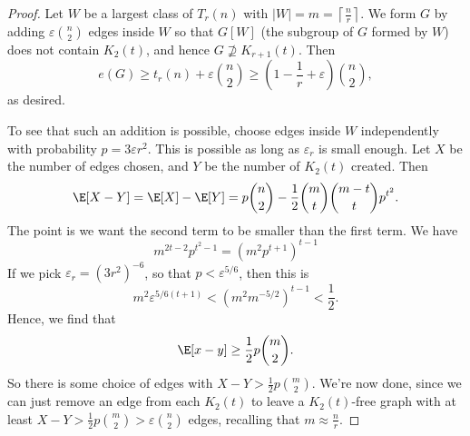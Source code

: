 \documentclass[a4paper]{article}
\begin{document}
\begin{proof}
  Let $W$ be a largest class of $T_r(n)$ with $|W| = m = \left\lceil \frac{n}{r}\right\rceil$. We form $G$ by adding $\varepsilon \binom{n}{2}$ edges inside $W$ so that $G[W]$ (the subgroup of $G$ formed by $W$) does not contain $K_2(t)$, and hence $G \not\supseteq K_{r + 1}(t)$. Then
  \[
    e(G) \geq t_r(n) + \varepsilon \binom{n}{2} \geq \left(1 - \frac{1}{r} +\varepsilon \right) \binom{n}{2},
  \]
  as desired.

  To see that such an addition is possible, choose edges inside $W$ independently with probability $p = 3 \varepsilon r^2$. This is possible as long as $\varepsilon_r$ is small enough. Let $X$ be the number of edges chosen, and $Y$ be the number of $K_2(t)$ created. Then
  \[
    \E[X - Y] = \E[X] - \E[Y] = p\binom{n}{2} - \frac{1}{2}\binom{m}{t} \binom{m - t}{t} p^{t^2}.
  \]
  The point is we want the second term to be smaller than the first term. We have
  \[
    m^{2t - 2}p^{t^2 - 1} = (m^2 p^{t + 1})^{t - 1}
  \]
  If we pick $\varepsilon_r = (3r^2)^{-6}$, so that $p < \varepsilon^{5/6}$, then this is
  \[
    m^2 \varepsilon^{5/6 (t + 1)} < (m^2 m^{-5/2})^{t - 1} < \frac{1}{2}.
  \]
  Hence, we find that
  \[
    \E[x - y] \geq \frac{1}{2} p \binom{m}{2}.
  \]
  So there is some choice of edges with $X - Y > \frac{1}{2} p \binom{m}{2}$. We're now done, since we can just remove an edge from each $K_2(t)$ to leave a $K_2(t)$-free graph with at least $X - Y > \frac{1}{2}p \binom{m}{2} > \varepsilon \binom{n}{2}$ edges, recalling that $m \approx \frac{n}{r}$.
\end{proof}
\printindex
\end{document}
